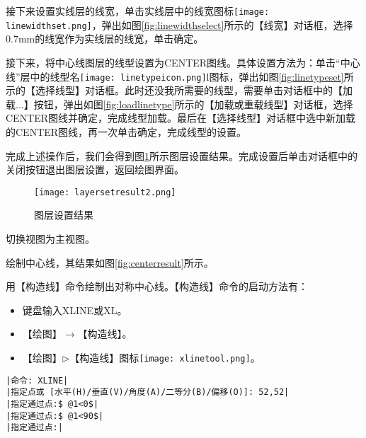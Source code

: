 \begin{procedure}
\begin{figure}[htbp]
\centering
\begin{floatrow}
\end{floatrow}
\end{figure}

接下来设置实线层的线宽，单击实线层中的线宽图标\texttt{[image: linewidthset.png]}，弹出如图\ref{fig:linewidthselect}所示的【线宽】对话框，选择0.7mm的线宽作为实线层的线宽，单击确定。

接下来，将中心线图层的线型设置为CENTER图线。具体设置方法为：单击“中心线”层中的线型名\texttt{[image: linetypeicon.png]}l图标，弹出如图\ref{fig:linetypeset}所示的【选择线型】对话框。此时还没我所需要的线型，需要单击对话框中的【加载...】按钮，弹出如图\ref{fig:loadlinetype}所示的【加载或重载线型】对话框，选择CENTER图线并确定，完成线型加载。最后在【选择线型】对话框中选中新加载的CENTER图线，再一次单击确定，完成线型的设置。
\begin{figure}[htbp]
\centering
\begin{floatrow}
\end{floatrow}
\end{figure}

完成上述操作后，我们会得到图\ref{fig:layersetresult2}所示图层设置结果。完成设置后单击对话框中的关闭按钮退出图层设置，返回绘图界面。
\begin{figure}[htbp]
\centering
\texttt{[image: layersetresult2.png]}
\caption{图层设置结果}\label{fig:layersetresult2}
\end{figure}

\item 切换视图为主视图。
\item 绘制中心线，其结果如图\ref{fig:centerresult}所示。

用【构造线】命令绘制出对称中心线。【构造线】命令的启动方法有：
\begin{itemize}
\item 键盘输入XLINE或XL。
\item 【绘图】$\rightarrow$【构造线】。
\item 【绘图】$\triangleright$【构造线】图标\texttt{[image: xlinetool.png]}。
\end{itemize}
\begin{lstlisting}
|命令: XLINE|
|指定点或 [水平(H)/垂直(V)/角度(A)/二等分(B)/偏移(O)]: 52,52|
|指定通过点:$ @1<0$|
|指定通过点:$ @1<90$|
|指定通过点:|
\end{lstlisting}


\end{procedure}
